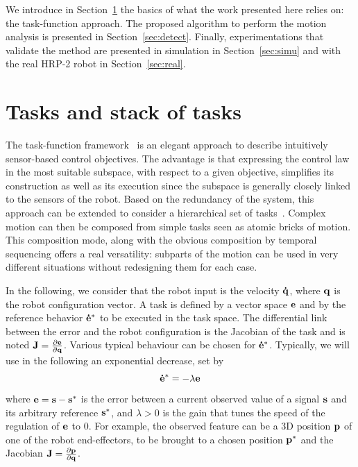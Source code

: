\documentclass[journal]{IEEEtran}
\begin{document}
We introduce in Section~\ref{sec:sot} the basics of what the work presented here
relies on: the task-function approach. The proposed algorithm to perform the
motion analysis is presented in Section~\ref{sec:detect}.
Finally, experimentations that validate the method are presented in
simulation in Section~\ref{sec:simu} and with the real HRP-2 robot in Section~\ref{sec:real}.

\section{Tasks and stack of tasks}
\label{sec:sot}
The task-function framework~\cite{samson91} is an elegant approach to describe intuitively
sensor-based control objectives. The advantage is that expressing the control law
in the most suitable subspace, with respect to a given objective, simplifies its construction
as well as its execution since the subspace is generally closely linked to the sensors of
the robot. Based on the redundancy of the system, this
approach can be extended to consider a hierarchical set of
tasks~\cite{siciliano91}. Complex motion can then be composed from simple tasks seen as atomic bricks
of motion. This composition mode, along with the obvious composition by temporal
sequencing offers a real versatility: subparts of the motion can be used in
very different situations without redesigning them for each case.

In the following, we consider that the robot input is the velocity ${\mathbf{\dot{q}}}$,
where ${\mathbf{q}}$ is the robot configuration vector.
A task is defined by a vector space
${\mathbf{e}}$ and by the reference behavior ${\mathbf{\dot{e}^*}}$ to be
executed in the task space.
The differential link between the error and the robot configuration is
the Jacobian of the task and is noted
${\mathbf{J}}=\frac{\partial{{\mathbf{e}}}}{\partial{{\mathbf{q}}}}$.
Various typical behaviour can be chosen for ${\mathbf{\dot{e}^*}}$. Typically, we will
use in the following an exponential decrease, set by
\begin{equation}
  \mbf{\dot{e}^*} = -\lambda\mbf{e}
  \label{eq:lambda}
\end{equation}
where ${\mathbf{e}} = {\mathbf{s}} - {\mathbf{s^*}}$ is the error between a current
observed value of a signal ${\mathbf{s}}$ and its arbitrary reference ${\mathbf{s^*}}$,
and $\lambda>0$ is the gain that tunes the speed of the regulation of ${\mathbf{e}}$ to $0$.
For example, the observed feature can be a 3D position ${\mathbf{p}}$ of one of
the robot end-effectors, to be brought to a chosen position ${\mathbf{p^*}}$
and the Jacobian ${\mathbf{J}} = \frac{\partial{{\mathbf{p}}}}{\partial{{\mathbf{q}}}}$.
\end{document}
